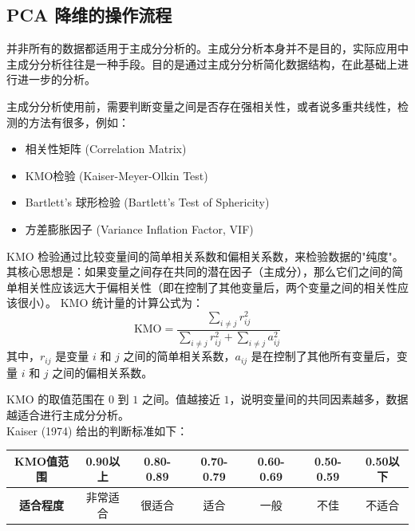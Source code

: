 \subsection{PCA 降维的操作流程}

\begin{warning}
    并非所有的数据都适用于主成分分析的。主成分分析本身并不是目的，实际应用中主成分分析往往是一种手段。目的是通过主成分分析简化数据结构，在此基础上进行进一步的分析。

    主成分分析使用前，需要判断变量之间是否存在强相关性，或者说多重共线性，检测的方法有很多，例如：
    \begin{itemize}
        \item 相关性矩阵 (Correlation Matrix)
        \item KMO检验 (Kaiser-Meyer-Olkin Test)
        \item Bartlett's 球形检验 (Bartlett's Test of Sphericity)
        \item 方差膨胀因子 (Variance Inflation Factor, VIF)
    \end{itemize}
\end{warning}

\begin{definition}[KMO 检验]
    KMO 检验通过比较变量间的简单相关系数和偏相关系数，来检验数据的"纯度"。其核心思想是：如果变量之间存在共同的潜在因子（主成分），那么它们之间的简单相关性应该远大于偏相关性（即在控制了其他变量后，两个变量之间的相关性应该很小）。
    KMO 统计量的计算公式为：
    \begin{equation}
        \text{KMO} = \frac{\displaystyle\sum_{i \neq j} r_{ij}^2}{\displaystyle\sum_{i \neq j} r_{ij}^2 + \sum_{i \neq j} a_{ij}^2}
    \end{equation}
    其中，$r_{ij}$ 是变量 $i$ 和 $j$ 之间的简单相关系数，$a_{ij}$ 是在控制了其他所有变量后，变量 $i$ 和 $j$ 之间的偏相关系数。

    KMO 的取值范围在 $0$ 到 $1$ 之间。值越接近 $1$，说明变量间的共同因素越多，数据越适合进行主成分分析。\\
    Kaiser (1974) 给出的判断标准如下：
    \begin{table}[H]
        \centering
        \begin{tabular}{ccccccc}
            \toprule
            \textbf{KMO值范围} & 0.90以上 & 0.80-0.89 & 0.70-0.79 & 0.60-0.69 & 0.50-0.59 & 0.50以下 \\
            \midrule
            \textbf{适合程度}   & 非常适合   & 很适合       & 适合        & 一般        & 不佳        & 不适合    \\
            \bottomrule
        \end{tabular}
    \end{table}
\end{definition}

